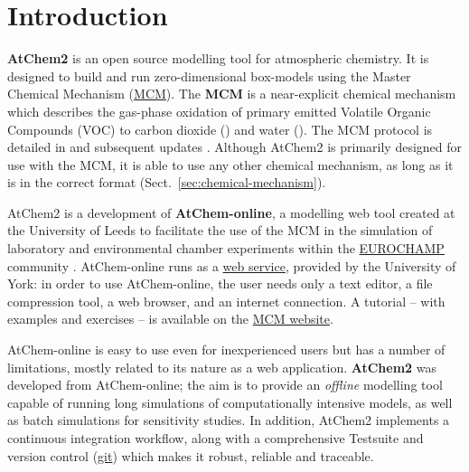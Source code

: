 %
%
%
%

\chapter{Introduction} \label{ch:introduction}

\textbf{AtChem2} is an open source modelling tool for atmospheric
chemistry. It is designed to build and run zero-dimensional
box-models using the Master Chemical Mechanism
(\href{https://mcm.york.ac.uk/MCM}{MCM}). The \textbf{MCM} is a
near-explicit chemical mechanism which describes the gas-phase
oxidation of primary emitted Volatile Organic Compounds (VOC) to
carbon dioxide () and water (). The MCM protocol is
detailed in \citet{jenkin_1997} and subsequent updates
\citep{saunders_2003, jenkin_2003, bloss_2005, jenkin_2012, jenkin_2015}.
Although AtChem2 is primarily designed for use with the MCM, it is
able to use any other chemical mechanism, as long as it is in the
correct format (Sect.~\ref{sec:chemical-mechanism}).

AtChem2 is a development of \textbf{AtChem-online}, a modelling web
tool created at the University of Leeds to facilitate the use of the
MCM in the simulation of laboratory and environmental chamber
experiments within the \href{https://www.eurochamp.org}{EUROCHAMP}
community \citep{martin_2009}. AtChem-online runs as a
\href{https://atchem.york.ac.uk}{web service}, provided by the
University of York: in order to use AtChem-online, the user needs only
a text editor, a file compression tool, a web browser, and an internet
connection. A tutorial -- with examples and exercises -- is available on
the \href{https://mcm.york.ac.uk/MCM/atchemonline/intro}{MCM website}.

AtChem-online is easy to use even for inexperienced users but has a
number of limitations, mostly related to its nature as a web
application. \textbf{AtChem2} was developed from AtChem-online; the
aim is to provide an \emph{offline} modelling tool capable of running
long simulations of computationally intensive models, as well as batch
simulations for sensitivity studies. In addition, AtChem2 implements a
continuous integration workflow, along with a comprehensive Testsuite
and version control (\href{https://git-scm.com}{git}) which makes it
robust, reliable and traceable.


